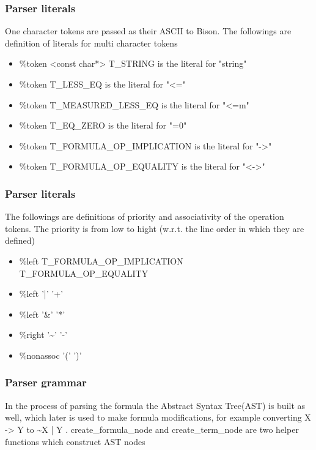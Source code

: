 \documentclass{article}
\begin{document}
		\subsubsection*{Parser literals}
			One character tokens are passed as their ASCII to Bison.
			The followings are definition of literals for multi character tokens
			\begin{itemize}
				\item \%token <const char*> T\_STRING is the literal for "string"
				\item \%token T\_LESS\_EQ is the literal for "<="
				\item \%token T\_MEASURED\_LESS\_EQ is the literal for "<=m"
				\item \%token T\_EQ\_ZERO is the literal for "=0"
				\item \%token T\_FORMULA\_OP\_IMPLICATION is the literal for "->"
				\item \%token T\_FORMULA\_OP\_EQUALITY is the literal for "<->"
			\end{itemize}

		\subsubsection*{Parser literals}
			The followings are definitions of priority and associativity of the operation tokens. 
			The priority is from low to hight (w.r.t. the line order in which they are defined)
			\begin{itemize}
				\item \%left T\_FORMULA\_OP\_IMPLICATION T\_FORMULA\_OP\_EQUALITY
				\item \%left '|' '+'
				\item \%left '\&' '*'
				\item \%right '\textasciitilde' '-'
				\item \%nonassoc '(' ')'
			\end{itemize}

		\subsubsection*{Parser grammar}
			In the process of parsing the formula the Abstract Syntax Tree(AST) is built as well, 
			which later is used to make formula modifications, for example converting X -> Y to \textasciitilde X | Y .
			\newline
			create\_formula\_node and create\_term\_node are two helper functions which construct AST nodes
\end{document}

